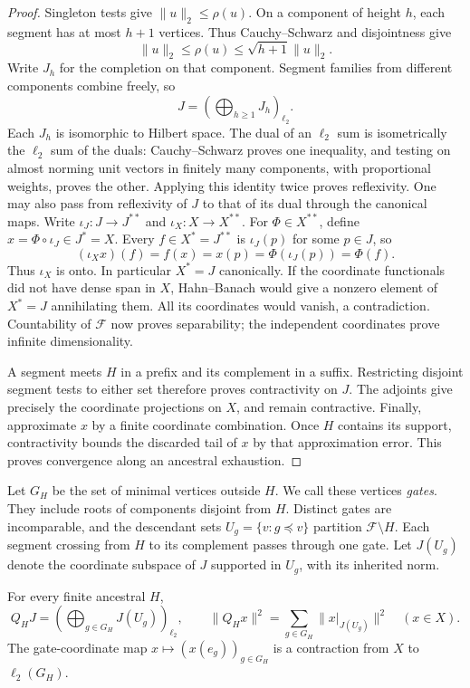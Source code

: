 \begin{proof}
Singleton tests give $\|u\|_2\le\rho(u)$. On a component of height
$h$, each segment has at most $h+1$ vertices. Thus Cauchy--Schwarz and
disjointness give
\[
 \|u\|_2\le\rho(u)\le\sqrt{h+1}\|u\|_2.
\]
Write $J_h$ for the completion on that component. Segment families
from different components combine freely, so
\[
 J=\left(\bigoplus_{h\ge1}J_h\right)_{\ell_2}.
\]
Each $J_h$ is isomorphic to Hilbert space. The dual of an $\ell_2$
sum is isometrically the $\ell_2$ sum of the duals: Cauchy--Schwarz
proves one inequality, and testing on almost norming unit vectors in
finitely many components, with proportional weights, proves the other.
Applying this identity twice proves reflexivity. One may also pass
from reflexivity of $J$ to that of its dual through the canonical maps.
Write $\iota_J:J\to J^{**}$ and $\iota_X:X\to X^{**}$.
For $\Phi\in X^{**}$, define $x=\Phi\circ\iota_J\in J^*=X$.
Every $f\in X^*=J^{**}$ is $\iota_J(p)$ for some $p\in J$, so
\[
 (\iota_Xx)(f)=f(x)=x(p)=\Phi(\iota_J(p))=\Phi(f).
\]
Thus $\iota_X$ is onto. In particular $X^*=J$ canonically. If the coordinate functionals did not have dense span in
$X$, Hahn--Banach would give a nonzero element of $X^*=J$ annihilating
them. All its coordinates would vanish, a contradiction. Countability
of $\mathcal F$ now proves separability; the independent coordinates
prove infinite dimensionality.

A segment meets $H$ in a prefix and its complement in a suffix.
Restricting disjoint segment tests to either set therefore proves
contractivity on $J$. The adjoints give precisely the coordinate
projections on $X$, and remain contractive. Finally, approximate $x$
by a finite coordinate combination. Once $H$ contains its support,
contractivity bounds the discarded tail of $x$ by that approximation
error. This proves convergence along an ancestral exhaustion.
\end{proof}

Let $G_H$ be the set of minimal vertices outside $H$. We call these
vertices \emph{gates}. They include roots of components disjoint from
$H$. Distinct gates are incomparable, and the descendant sets
$U_g=\{v:g\preceq v\}$ partition $\mathcal F\setminus H$.
Each segment crossing from $H$ to its complement passes through one
gate. Let $J(U_g)$ denote the coordinate subspace of $J$ supported in
$U_g$, with its inherited norm.

\begin{lemma}\label{lem:cones}
For every finite ancestral $H$,
\begin{equation}\label{eq:cone-decomposition}
 Q_HJ=\left(\bigoplus_{g\in G_H}J(U_g)\right)_{\ell_2},
 \qquad
 \|Q_Hx\|^2=\sum_{g\in G_H}\|x|_{J(U_g)}\|^2\quad(x\in X).
\end{equation}
The gate-coordinate map $x\mapsto(x(e_g))_{g\in G_H}$ is a contraction
from $X$ to $\ell_2(G_H)$.
\end{lemma}

